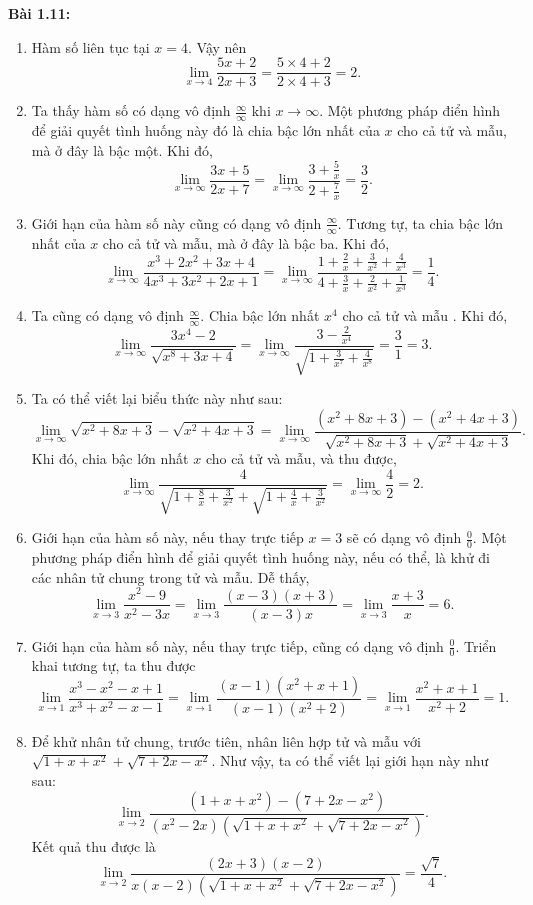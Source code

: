 \vspace{5pt}
\textbf{Bài 1.11:}
\begin{enumerate}[label=(\alph*)]   
    \item Hàm số liên tục tại \(x=4\). Vậy nên \[\lim_{x\rightarrow 4}\frac{5x+2}{2x+3}=\frac{5\times 4+2}{2\times 4+3}=2.\]
    \item Ta thấy hàm số có dạng vô định \(\frac{\infty}{\infty}\) khi \(x\rightarrow\infty\). Một phương pháp điển hình để giải quyết tình huống này đó là chia bậc lớn nhất của \(x\) cho cả tử và mẫu, mà ở đây là bậc một. Khi đó, \[\lim_{x\rightarrow\infty}\frac{3x+5}{2x+7}=\lim_{x\rightarrow\infty}\frac{3+\frac{5}{x}}{2+\frac{7}{x}}=\frac{3}{2}.\] 
    \item Giới hạn của hàm số này cũng có dạng vô định \(\frac{\infty}{\infty}\). Tương tự, ta chia bậc lớn nhất của \(x\) cho cả tử và mẫu, mà ở đây là bậc ba. Khi đó, \[\lim_{x\rightarrow\infty}\frac{x^3 +2x^2 +3x+4}{4x^3 +3x^2 +2x+1}=\lim_{x\rightarrow\infty}\frac{1+\frac{2}{x}+\frac{3}{x^2}+\frac{4}{x^3}}{4+\frac{3}{x}+\frac{2}{x^2}+\frac{1}{x^3}}=\frac{1}{4}.\]
    \item Ta cũng có dạng vô định \(\frac{\infty}{\infty}\). Chia bậc lớn nhất  \(x^4\) cho cả tử và mẫu . Khi đó, \[\lim_{x\rightarrow\infty}\frac{3x^4 -2}{\sqrt{x^8+3x+4}}=\lim_{x\rightarrow\infty}\frac{3-\frac{2}{x^4}}{\sqrt{1+\frac{3}{x^7}+\frac{4}{x^8}}}=\frac{3}{1}=3.\]
    \item Ta có thể viết lại biểu thức này như sau: \[\lim_{x\rightarrow\infty}\sqrt{x^2 +8x+3}-\sqrt{x^2+4x+3}=\lim_{x\rightarrow\infty}\frac{(x^2 +8x+3)-(x^2+4x+3)}{\sqrt{x^2 +8x+3}+\sqrt{x^2+4x+3}}.\] Khi đó, chia bậc lớn nhất \(x\) cho cả tử và mẫu, và thu được, \[\lim_{x\rightarrow\infty}\frac{4}{\sqrt{1+\frac{8}{x}+\frac{3}{x^2}}+\sqrt{1+\frac{4}{x}+\frac{3}{x^2}}}=\lim_{x\rightarrow\infty}\frac{4}{2}=2.\]
    \item Giới hạn của hàm số này, nếu thay trực tiếp \(x=3\) sẽ có dạng vô định \(\frac{0}{0}\). Một phương pháp điển hình để giải quyết tình huống này, nếu có thể, là khử đi các nhân tử chung trong tử và mẫu. Dễ thấy, \[\lim_{x\rightarrow 3}\frac{x^2 -9}{x^2-3x}=\lim_{x\rightarrow 3}\frac{(x-3)(x+3)}{(x-3)x}=\lim_{x\rightarrow 3}\frac{x+3}{x}=6.\]  
    \item Giới hạn của hàm số này, nếu thay trực tiếp, cũng có dạng vô định \(\frac{0}{0}\). Triển khai tương tự, ta thu được \[\lim_{x\rightarrow 1}\frac{x^3 -x^2 -x+1}{x^3+x^2 -x-1}=\lim_{x\rightarrow 1}\frac{(x-1)(x^2+x+1)}{(x-1)(x^2+2)}=\lim_{x\rightarrow 1}\frac{x^2+x+1}{x^2+2}=1.\]
    \item Để khử nhân tử chung, trước tiên, nhân liên hợp tử và mẫu với \(\sqrt{1+x+x^2}+\sqrt{7+2x-x^2}\). Như vậy, ta có thể viết lại giới hạn này như sau: \[\lim_{x\rightarrow 2}\frac{(1+x+x^2)-(7+2x-x^2)}{(x^2-2x)(\sqrt{1+x+x^2}+\sqrt{7+2x-x^2})}.\] Kết quả thu được là \[\lim_{x\rightarrow 2}\frac{(2x+3)(x-2)}{x(x-2)(\sqrt{1+x+x^2}+\sqrt{7+2x-x^2})}=\frac{\sqrt{7}}{4}.\]    
\end{enumerate}
\vspace{5pt}

